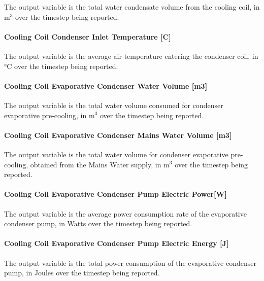 The output variable is the total water condensate volume from the cooling coil, in m\(^{3}\) over the timestep being reported.

\paragraph{Cooling Coil Condenser Inlet Temperature {[}C{]}}\label{cooling-coil-condenser-inlet-temperature-c-1}

The output variable is the average air temperature entering the condenser coil, in °C over the timestep being reported.

\paragraph{Cooling Coil Evaporative Condenser Water Volume {[}m3{]}}\label{cooling-coil-evaporative-condenser-water-volume-m3-1}

The output variable is the total water volume consumed for condenser evaporative pre-cooling, in m\(^{3}\) over the timestep being reported.

\paragraph{Cooling Coil Evaporative Condenser Mains Water Volume {[}m3{]}}\label{cooling-coil-evaporative-condenser-mains-water-volume-m3}

The output variable is the total water volume for condenser evaporative pre-cooling, obtained from the Mains Water supply, in m\(^{3}\) over the timestep being reported.

\paragraph{Cooling Coil Evaporative Condenser Pump Electric Power{[}W{]}}\label{cooling-coil-evaporative-condenser-pump-electric-powerw}

The output variable is the average power consumption rate of the evaporative condenser pump, in Watts over the timestep being reported.

\paragraph{Cooling Coil Evaporative Condenser Pump Electric Energy {[}J{]}}\label{cooling-coil-evaporative-condenser-pump-electric-energy-j-1}

The output variable is the total power consumption of the evaporative condenser pump, in Joules over the timestep being reported.


